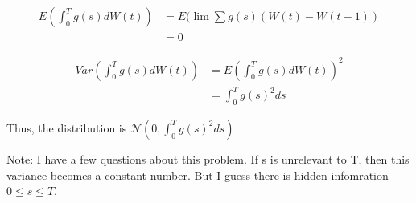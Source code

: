 \documentclass[11pt]{article} %
\begin{document}
\begin{align*}
    E(\int_0^T g(s)dW(t)) &= E(\lim \sum g(s)(W(t)-W(t-1))\\
                          &= 0
\end{align*}

\begin{align*}
    Var(\int_0^T g(s)dW(t)) &= E(\int_0^T g(s)dW(t))^2\\
                            &= \int_0^T g(s)^2ds                         
\end{align*}


Thus, the distribution is $\mathcal{N}(0,\int_0^T g(s)^2ds)$

Note: I have a few questions about this problem. If s is unrelevant to T, then this variance becomes a constant number. But I guess there is hidden infomration $0\leq s \leq T$.
\end{document}
